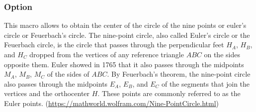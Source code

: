 \begin{tkzexample}[latex=7.5cm,small]
\end{tkzexample}

\vspace*{-10pt}

\subsubsection{Option }

This macro allows to obtain the center of the circle of the nine points or
euler's circle or Feuerbach's circle.
The nine-point circle, also called Euler's circle or the Feuerbach circle, is
the circle that passes through the perpendicular feet $H_A$, $H_B$, and $H_C$
dropped from the vertices of any reference triangle $ABC$ on the sides opposite
them. Euler showed in 1765 that it also passes through the midpoints $M_A$,
$M_B$, $M_C$ of the sides of $ABC$. By Feuerbach's theorem, the nine-point
circle also passes through the midpoints $E_A$, $E_B$, and $E_C$ of the segments
that join the vertices and the orthocenter $H$. These points are commonly
referred to as the Euler points.
(\url{https://mathworld.wolfram.com/Nine-PointCircle.html})


\begin{tkzexample}[latex=7.5cm,small]
\end{tkzexample}

